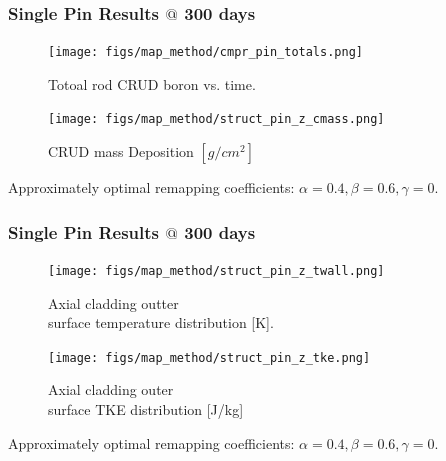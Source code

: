 \documentclass[t, pdftex]{beamer}
\begin{document}
\begin{frame}
\frametitle{Single Pin Results $@$ 300 days}
    \begin{figure}
        \centering
        \begin{minipage}{.5\textwidth}
            \centering
            \texttt{[image: figs/map\_method/cmpr\_pin\_totals.png]}
            \caption{Totoal rod CRUD boron vs. time.}
        \end{minipage}%
        \begin{minipage}{.5\textwidth}
            \centering
            \texttt{[image: figs/map\_method/struct\_pin\_z\_cmass.png]}
            \caption{ CRUD mass Deposition $[g/cm^2]$}
        \end{minipage}
    \end{figure}
Approximately optimal remapping coefficients: $\alpha=0.4, \beta=0.6, \gamma=0$.  
\end{frame}

\begin{frame}
\frametitle{Single Pin Results $@$ 300 days}
    \begin{figure}
        \centering
        \begin{minipage}{.5\textwidth}
            \centering
            \texttt{[image: figs/map\_method/struct\_pin\_z\_twall.png]}
            \caption{Axial cladding outter \\ surface temperature distribution [K].}
        \end{minipage}%
        \begin{minipage}{.5\textwidth}
            \centering
            \texttt{[image: figs/map\_method/struct\_pin\_z\_tke.png]}
            \caption{ Axial cladding outer \\ surface TKE distribution [J/kg]}
        \end{minipage}
    \end{figure}
Approximately optimal remapping coefficients: $\alpha=0.4, \beta=0.6, \gamma=0$.  
\end{frame}
\end{document}
